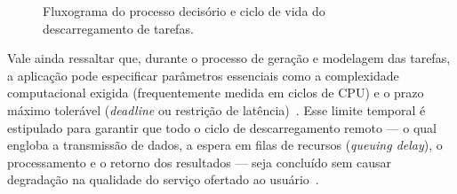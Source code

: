 \begin{figure}[htbp]
\caption{Fluxograma do processo decisório e ciclo de vida do descarregamento de tarefas.}
\label{fig:processo}
\end{figure}

Vale ainda ressaltar que, durante o processo de geração e modelagem das tarefas, a aplicação pode especificar parâmetros essenciais como a complexidade computacional exigida (frequentemente medida em ciclos de \gls{CPU}) e o prazo máximo tolerável (\textit{deadline} ou restrição de latência)~\cite{TrendSurvey, Dayong2024}. Esse limite temporal é estipulado para garantir que todo o ciclo de descarregamento remoto — o qual engloba a transmissão de dados, a espera em filas de recursos (\textit{queuing delay}), o processamento e o retorno dos resultados — seja concluído sem causar degradação na qualidade do serviço ofertado ao usuário~\cite{Zhang2023}.